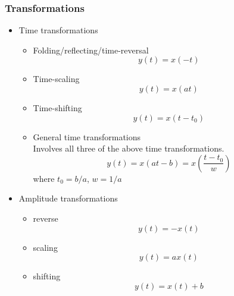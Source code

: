 \documentclass{article}
\theoremstyle{definition}
\begin{document}
\subsubsection{Transformations}
\begin{itemize}
    \item Time transformations
        \begin{itemize}
            \item Folding/reflecting/time-reversal
                \begin{equation}
                    y(t)=x(-t)
                \end{equation}
            \item Time-scaling
                \begin{equation}
                    y(t)=x(at)
                \end{equation}
            \item Time-shifting
                \begin{equation}
                    y(t)=x(t-t_0)
                \end{equation}
            \item General time transformations\\
                Involves all three of the above time transformations.
                \begin{equation}
                    y(t) = x(at-b)=x(\frac{t-t_0}{w})
                \end{equation}
                where $ t_0 = b/a $, $ w=1/a $
        \end{itemize}
    \item Amplitude transformations
        \begin{itemize}
            \item reverse\\
                \begin{equation}
                    y(t)=-x(t)
                \end{equation}
            \item scaling
                \begin{equation}
                    y(t) = ax(t)
                \end{equation}
            \item shifting
                \begin{equation}
                    y(t)=x(t)+b
                \end{equation}
        \end{itemize}

\end{itemize}
\end{document}
